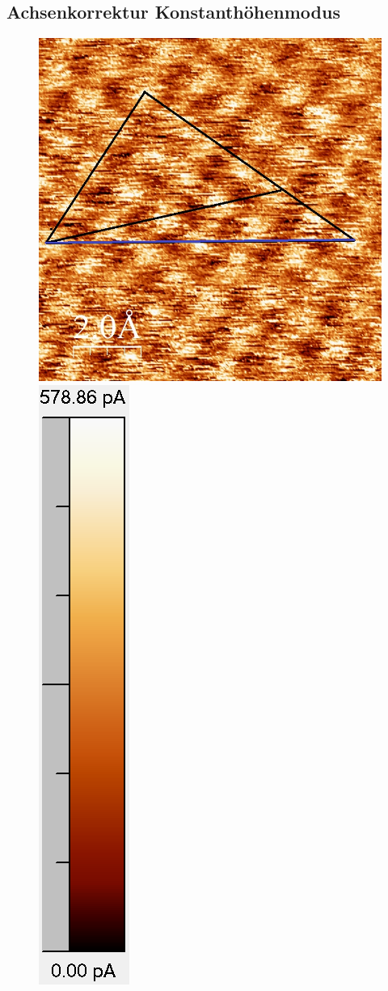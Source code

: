 \documentclass[12pt,a4paper]{article}
\begin{document}
\subsection{Achsenkorrektur Konstanthöhenmodus}
\begin{figure}[H]
\centering
\includegraphics[scale=0.36]{Bilder/Atome/hoch1_h.jpg}
\includegraphics[scale=0.49]{Bilder/Atome/hoch1_scale.png}

\end{figure}
\end{document}
